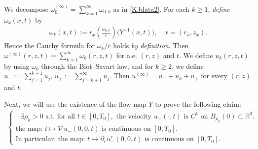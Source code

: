 \documentclass[reqno,11pt]{amsart}
\begin{document}
    
We decompose $\omega_0^{(\infty)}=\sum_{k=1}^\infty \omega_{0,k}$ as in \eqref{KJdata2}. 
For each $k\geq 1$, \emph{define} $\omega_k(x,t)$ by 
    \begin{align*}
        \omega_k(x,t):=
        r_x
        \left(
        \frac{\omega_{0,k}}{r}
        \right)\big( Y^{-1}(x,t)\big) , \quad x=(r_x,z_x).
    \end{align*}
Hence the Cauchy formula for $\omega_k/r$ holds \emph{by definition}.
Then 
$\omega^{(\infty)}(r,z,t)=\sum_{k=1}^\infty\omega_k(r,z,t)$ for a.e. $(r,z)$ and $t$. We define $u_k(r,z,t)$ by using $\omega_k$ through the Biot--Savart law, and for $k \geq 2$, we define $u_-:=\sum_{j=1}^{k-1} u_j,\,  u_+:=\sum_{j=k+1}^\infty u_j.$ Then $u^{(\infty)}=u_-+u_k +u_+$ for every $(r,z)$ and $t$.

Next, we will use the existence of the flow map $Y$ to prove the following claim:
    \begin{align}
    \label{claim_reg_outer}
    \begin{cases}
        \text{ $\exists \rho_k>0$ s.t. for all $t\in[0,T_0],$ the velocity $u_-(\cdot,t)$ is $C^1$ on $B_{\rho_k} (0) \subset \mathbb{R}^3$.}
    \\
       \text{the map: $t\mapsto \nabla u_-(0,0,t)$ is continuous on $[0,T_0]$.}  
    \\
        \text{In particular, the map: $t\mapsto \partial_r u^r_-(0,0,t)$ is continuous on $[0,T_0]$.} 
    \end{cases}
    \end{align}
\end{document}
